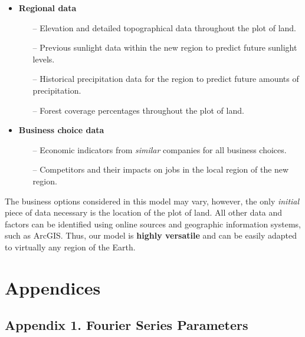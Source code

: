 \documentclass{mcmthesis}
\begin{document}
\begin{itemize}
    \item \textbf{Regional data}
    \begin{itemize}
        \item[–] Elevation and detailed topographical data throughout the plot of land.
        \item[–] Previous sunlight data within the new region to predict future sunlight levels.
        \item[–] Historical precipitation data for the region to predict future amounts of precipitation.
        \item[–] Forest coverage percentages throughout the plot of land.
    \end{itemize}
    \item \textbf{Business choice data}
    \begin{itemize}
        \item[–] Economic indicators from \textit{similar} companies for all business choices.
        \item[–] Competitors and their impacts on jobs in the local region of the new region.
    \end{itemize}
\end{itemize}

The business options considered in this model may vary, however, the only \textit{initial} piece of data necessary is the location of the plot of land. All other data and factors can be identified using online sources and geographic information systems, such as ArcGIS. Thus, our model is \textbf{highly versatile} and can be easily adapted to virtually any region of the Earth. 
\newpage



\pagebreak

\section{Appendices}

\subsection{Appendix 1. Fourier Series Parameters}
\end{document}
